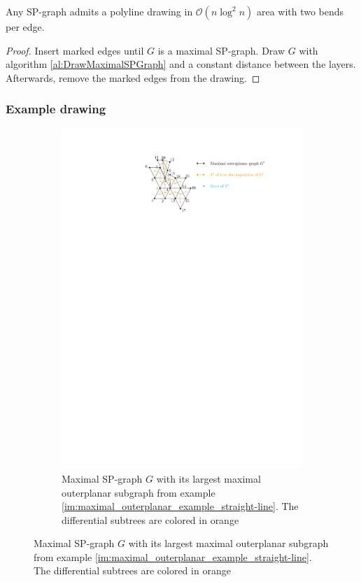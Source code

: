\begin{theorem}
	Any SP-graph admits a polyline drawing in $\mathcal{O}(n \log^2 n)$ area with two bends per edge.
\end{theorem}
\begin{proof}
	Insert marked edges until $G$ is a maximal SP-graph. Draw $G$ with algorithm \ref{al:DrawMaximalSPGraph} and a constant distance between the layers. Afterwards, remove the marked edges from the drawing.
\end{proof}

\subsubsection{Example drawing}

\begin{figure}[H]
	\centering
	\begin{subfigure}{\textwidth}
		\centering
		\includegraphics[page=10,width=0.8\linewidth]{graphics/maximal_outerplanar_example_drawings.pdf}
			\caption{Maximal SP-graph $G$ with its largest maximal outerplanar subgraph from example \ref{im:maximal_outerplanar_example_straight-line}. The differential subtrees are colored in orange}

\end{subfigure}
\end{figure}

